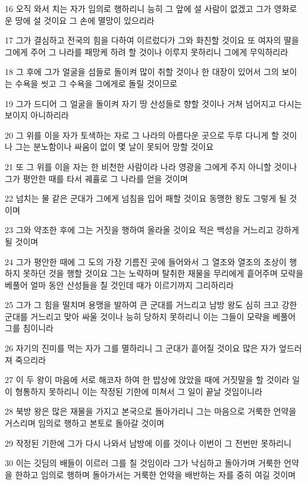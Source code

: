 \par 16 오직 와서 치는 자가 임의로 행하리니 능히 그 앞에 설 사람이 없겠고 그가 영화로운 땅에 설 것이요 그 손에 멸망이 있으리라
\par 17 그가 결심하고 전국의 힘을 다하여 이르렀다가 그와 화친할 것이요 또 여자의 딸을 그에게 주어 그 나라를 패망케 하려 할 것이나 이루지 못하리니 그에게 무익하리라
\par 18 그 후에 그가 얼굴을 섬들로 돌이켜 많이 취할 것이나 한 대장이 있어서 그의 보이는 수욕을 씻고 그 수욕을 그에게로 돌릴 것이므로
\par 19 그가 드디어 그 얼굴을 돌이켜 자기 땅 산성들로 향할 것이나 거쳐 넘어지고 다시는 보이지 아니하리라
\par 20 그 위를 이을 자가 토색하는 자로 그 나라의 아름다운 곳으로 두루 다니게 할 것이나 그는 분노함이나 싸움이 없이 몇 날이 못되어 망할 것이요
\par 21 또 그 위를 이을 자는 한 비천한 사람이라 나라 영광을 그에게 주지 아니할 것이나 그가 평안한 때를 타서 궤휼로 그 나라를 얻을 것이며
\par 22 넘치는 물 같은 군대가 그에게 넘침을 입어 패할 것이요 동맹한 왕도 그렇게 될 것이며
\par 23 그와 약조한 후에 그는 거짓을 행하여 올라올 것이요 적은 백성을 거느리고 강하게 될 것이며
\par 24 그가 평안한 때에 그 도의 가장 기름진 곳에 들어와서 그 열조와 열조의 조상이 행하지 못하던 것을 행할 것이요 그는 노략하며 탈취한 재물을 무리에게 흩어주며 모략을 베풀어 얼마 동안 산성들을 칠 것인데 때가 이르기까지 그리하리라
\par 25 그가 그 힘을 떨치며 용맹을 발하여 큰 군대를 거느리고 남방 왕도 심히 크고 강한 군대를 거느리고 맞아 싸울 것이나 능히 당하지 못하리니 이는 그들이 모략을 베풀어 그를 침이니라
\par 26 자기의 진미를 먹는 자가 그를 멸하리니 그 군대가 흩어질 것이요 많은 자가 엎드러져 죽으리라
\par 27 이 두 왕이 마음에 서로 해코자 하여 한 밥상에 앉았을 때에 거짓말을 할 것이라 일이 형통하지 못하리니 이는 작정된 기한에 미쳐서 그 일이 끝날 것임이니라
\par 28 북방 왕은 많은 재물을 가지고 본국으로 돌아가리니 그는 마음으로 거룩한 언약을 거스리며 임의로 행하고 본토로 돌아갈 것이며
\par 29 작정된 기한에 그가 다시 나와서 남방에 이를 것이나 이번이 그 전번만 못하리니
\par 30 이는 깃딤의 배들이 이르러 그를 칠 것임이라 그가 낙심하고 돌아가며 거룩한 언약을 한하고 임의로 행하며 돌아가서는 거룩한 언약을 배반하는 자를 중히 여길 것이며
